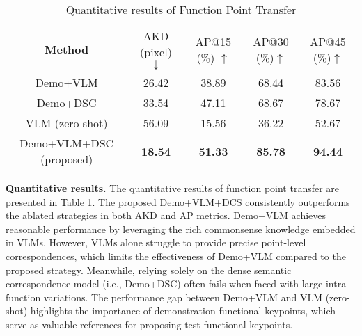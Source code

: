 \begin{table}[h]
\centering
\renewcommand\arraystretch{1.5}
\setlength\tabcolsep{3pt}%
  \vspace*{-0.1in}
\caption{Quantitative results of Function Point Transfer}
\begin{tabular}{ccccc}
\toprule
\multirow{2}{*}{\textbf{Method}} & \multirow{2}{*}{AKD (pixel) $\downarrow$} & \multirow{2}{*}{AP@15 (\%) $\uparrow$} & \multirow{2}{*}{AP@30 (\%)$\uparrow$} & \multirow{2}{*}{AP@45 (\%)$\uparrow$} \\
                                 &                              &                            &                            &                            \\ \hline
Demo+VLM                         & 26.42                        & 38.89                      & 68.44                      & 83.56                      \\
Demo+DSC                         & 33.54                        & 47.11                      & 68.67                      & 78.67                      \\
VLM (zero-shot)                  & 56.09                        & 15.56                      & 36.22                      & 52.67                      \\
Demo+VLM+DSC (proposed)          & \textbf{18.54}                        & \textbf{51.33}                      & \textbf{85.78}                      & \textbf{94.44}                      \\ \bottomrule
\end{tabular}
\label{tab:func_transfer}
\end{table}

\noindent \textbf{Quantitative results.} The quantitative results of function point transfer are presented in Table \ref{tab:func_transfer}. The proposed Demo+VLM+DCS consistently outperforms the ablated strategies in both AKD and AP metrics. Demo+VLM achieves reasonable performance by leveraging the rich commonsense knowledge embedded in VLMs. However, VLMs alone struggle to provide precise point-level correspondences, which limits the effectiveness of Demo+VLM compared to the proposed strategy. Meanwhile, relying solely on the dense semantic correspondence model (i.e., Demo+DSC) often fails when faced with large intra-function variations. The performance gap between Demo+VLM and VLM (zero-shot) highlights the importance of demonstration functional keypoints, which serve as valuable references for proposing test functional keypoints.

